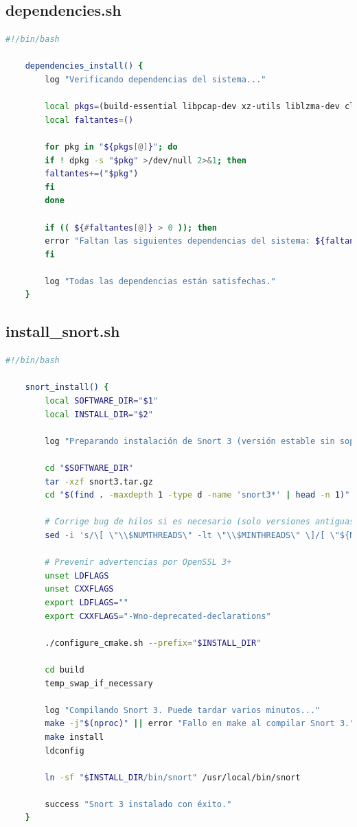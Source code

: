 \documentclass[11pt,a4paper,twoside]{report}
\begin{document}
\subsection*{dependencies.sh}
\begin{lstlisting}[language=bash, caption={dependencies.sh}, label={lst:dependencies-sh}]
	#!/bin/bash
	
	dependencies_install() {
		log "Verificando dependencias del sistema..."
		
		local pkgs=(build-essential libpcap-dev xz-utils liblzma-dev clamav clamav-daemon)
		local faltantes=()
		
		for pkg in "${pkgs[@]}"; do
		if ! dpkg -s "$pkg" >/dev/null 2>&1; then
		faltantes+=("$pkg")
		fi
		done
		
		if (( ${#faltantes[@]} > 0 )); then
		error "Faltan las siguientes dependencias del sistema: ${faltantes[*]}. Instálalas manualmente con: sudo apt install ${faltantes[*]}"
		fi
		
		log "Todas las dependencias están satisfechas."
	}
\end{lstlisting}

\subsection*{install\_snort.sh}
\begin{lstlisting}[language=bash, caption={install\_snort.sh}, label={lst:install-snort}]
	#!/bin/bash
	
	snort_install() {
		local SOFTWARE_DIR="$1"
		local INSTALL_DIR="$2"
		
		log "Preparando instalación de Snort 3 (versión estable sin soporte NUMA)..."
		
		cd "$SOFTWARE_DIR"
		tar -xzf snort3.tar.gz
		cd "$(find . -maxdepth 1 -type d -name 'snort3*' | head -n 1)"
		
		# Corrige bug de hilos si es necesario (solo versiones antiguas)
		sed -i 's/\[ \"\\$NUMTHREADS\" -lt \"\\$MINTHREADS\" \]/[ \"${NUMTHREADS:-0}\" -lt \"${MINTHREADS:-1}\" ]/' configure_cmake.sh
		
		# Prevenir advertencias por OpenSSL 3+
		unset LDFLAGS
		unset CXXFLAGS
		export LDFLAGS=""
		export CXXFLAGS="-Wno-deprecated-declarations"
		
		./configure_cmake.sh --prefix="$INSTALL_DIR"
		
		cd build
		temp_swap_if_necessary
		
		log "Compilando Snort 3. Puede tardar varios minutos..."
		make -j"$(nproc)" || error "Fallo en make al compilar Snort 3."
		make install
		ldconfig
		
		ln -sf "$INSTALL_DIR/bin/snort" /usr/local/bin/snort
		
		success "Snort 3 instalado con éxito."
	}
\end{lstlisting}
\end{document}
